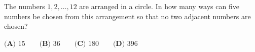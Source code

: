 The numbers $1,2,\dots,12$ are arranged in a circle. In how many ways can five numbers be chosen from this arrangement so that no two adjacent numbers are chosen?

$\textbf{(A) }15\qquad\textbf{(B) }36\qquad\textbf{(C) }180\qquad\textbf{(D) }396$
